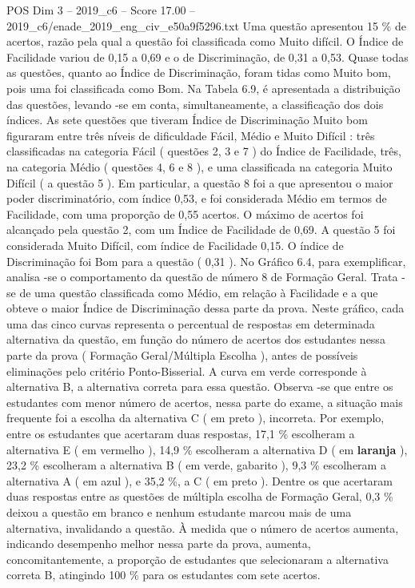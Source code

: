 \begin{textsample}{POS Dim 3 – 2019\_c6 – Score 17.00 – 2019\_c6/enade\_2019\_eng\_civ\_e50a9f5296.txt}
Uma questão apresentou 15 \% de acertos, razão pela qual a questão foi classificada como Muito difícil.
O Índice de Facilidade variou de 0,15 a 0,69 e o de Discriminação, de 0,31 a 0,53.
Quase todas as questões, quanto ao Índice de Discriminação, foram tidas como Muito bom, pois uma foi classificada como Bom.
Na Tabela 6.9, é apresentada a distribuição das questões, levando -se em conta, simultaneamente, a classificação dos dois índices.
As sete questões que tiveram Índice de Discriminação Muito bom figuraram entre três níveis de dificuldade Fácil, Médio e Muito Difícil : três classificadas na categoria Fácil ( questões 2, 3 e 7 ) do Índice de Facilidade, três, na categoria Médio ( questões 4, 6 e 8 ), e uma classificada na categoria Muito Difícil ( a questão 5 ).
Em particular, a questão 8 foi a que apresentou o maior poder discriminatório, com índice 0,53, e foi considerada Médio em termos de Facilidade, com uma proporção de 0,55 acertos.
O máximo de acertos foi alcançado pela questão 2, com um Índice de Facilidade de 0,69.
A questão 5 foi considerada Muito Difícil, com índice de Facilidade 0,15.
O índice de Discriminação foi Bom para a questão ( 0,31 ).
No Gráfico 6.4, para exemplificar, analisa -se o comportamento da questão de número 8 de Formação Geral.
Trata -se de uma questão classificada como Médio, em relação à Facilidade e a que obteve o maior Índice de Discriminação dessa parte da prova.
Neste gráfico, cada uma das cinco curvas representa o percentual de respostas em determinada alternativa da questão, em função do número de acertos dos estudantes nessa parte da prova ( Formação Geral/Múltipla Escolha ), antes de possíveis eliminações pelo critério Ponto-Bisserial.
A curva em verde corresponde à alternativa B, a alternativa correta para essa questão.
Observa -se que entre os estudantes com menor número de acertos, nessa parte do exame, a situação mais frequente foi a escolha da alternativa C ( em preto ), incorreta.
Por exemplo, entre os estudantes que acertaram duas respostas, 17,1 \% escolheram a alternativa E ( em vermelho ), 14,9 \% escolheram a alternativa D ( em \textbf{laranja} ), 23,2 \% escolheram a alternativa B ( em verde, gabarito ), 9,3 \% escolheram a alternativa A ( em azul ), e 35,2 \%, a C ( em preto ).
Dentre os que acertaram duas respostas entre as questões de múltipla escolha de Formação Geral, 0,3 \% deixou a questão em branco e nenhum estudante marcou mais de uma alternativa, invalidando a questão.
À medida que o número de acertos aumenta, indicando desempenho melhor nessa parte da prova, aumenta, concomitantemente, a proporção de estudantes que selecionaram a alternativa correta B, atingindo 100 \% para os estudantes com sete acertos.

\end{textsample}
